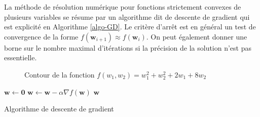 \documentclass[11pt,openany]{book}
\begin{document}
\begin{center}
\end{center}

La méthode de résolution numérique pour fonctions strictement convexes
de plusieurs variables se résume par un algorithme dit de descente de
gradient qui est explicité en Algorithme \ref{algo-GD}. Le critère
d'arrêt est en général un test de convergence de la forme
$f(\mathbf{w}_{i+1}) \approx f(\mathbf{w}_{i})$. On peut
également donner une borne sur le nombre maximal d'itérations si la
précision de la solution n'est pas essentielle.


\begin{figure}[htbp]
\begin{center}
\end{center}
\caption{\label{fig-bivariate}Contour de la fonction $f(w_1,w_2)= w_1^2+w_2^2+2w_1+8w_2$}
\end{figure}

\begin{algorithm}
\begin{algorithmic}
\State $\mathbf{w} \gets \mathbf{0}$
\State $\mathbf{w} \gets \mathbf{w} - \alpha \nabla f(\mathbf{w})$
\EndWhile
\State\Return $\mathbf{w}$
\EndFunction
\end{algorithmic}
\caption{\label{algo-GD}Algorithme de descente de gradient}
\end{algorithm}
\end{document}
